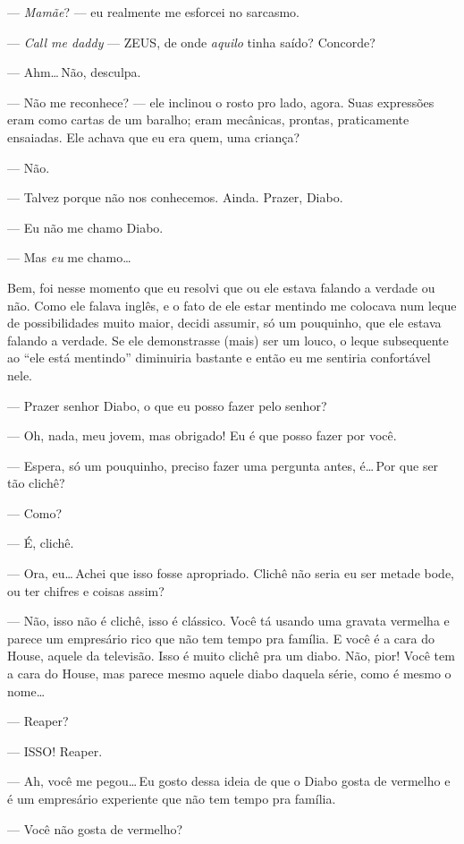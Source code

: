 --- \emph{Mamãe}? --- eu realmente me esforcei no sarcasmo.

--- \emph{Call me daddy} --- ZEUS, de onde \emph{aquilo} tinha saído? Concorde?

--- Ahm\ldots\,Não, desculpa.

--- Não me reconhece? --- ele inclinou o rosto pro lado, agora. Suas expressões eram como cartas de um baralho; eram mecânicas, prontas, praticamente ensaiadas. Ele achava que eu era quem, uma criança?

--- Não.

--- Talvez porque não nos conhecemos. Ainda. Prazer, Diabo.

--- Eu não me chamo Diabo.

--- Mas \emph{eu} me chamo\ldots

Bem, foi nesse momento que eu resolvi que ou ele estava falando a verdade ou não. Como ele falava inglês, e o fato de ele estar mentindo me colocava num leque de possibilidades muito maior, decidi assumir, só um pouquinho, que ele estava falando a verdade. Se ele demonstrasse (mais) ser um louco, o leque subsequente ao ``ele está mentindo'' diminuiria bastante e então eu me sentiria confortável nele.

--- Prazer senhor Diabo, o que eu posso fazer pelo senhor?

--- Oh, nada, meu jovem, mas obrigado! Eu é que posso fazer por você.

--- Espera, só um pouquinho, preciso fazer uma pergunta antes, é\ldots\,Por que ser tão clichê?

--- Como?

--- É, clichê.

--- Ora, eu\ldots\,Achei que isso fosse apropriado. Clichê não seria eu ser metade bode, ou ter chifres e coisas assim?

--- Não, isso não é clichê, isso é clássico. Você tá usando uma gravata vermelha e parece um empresário rico que não tem tempo pra família. E você é a cara do House, aquele da televisão. Isso é muito clichê pra um diabo. Não, pior! Você tem a cara do House, mas parece mesmo aquele diabo daquela série, como é mesmo o nome\ldots

--- Reaper?

--- ISSO! Reaper.

--- Ah, você me pegou\ldots\,Eu gosto dessa ideia de que o Diabo gosta de vermelho e é um empresário experiente que não tem tempo pra família.

--- Você não gosta de vermelho?

